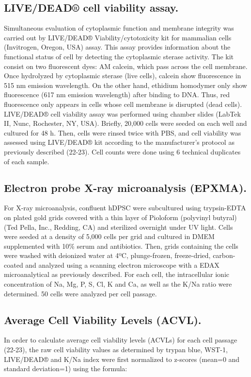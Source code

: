 \documentclass[a4paper,twocolumn,12pt]{article}
\begin{document}
\subsection{LIVE/DEAD® cell viability assay.}
Simultaneous evaluation of cytoplasmic function and membrane integrity was carried out by LIVE/DEAD® Viability/cytotoxicity kit for mammalian cells (Invitrogen, Oregon, USA) assay. This assay provides information about the functional status of cell by detecting the cytoplasmic sterase activity. The kit consist on two fluorescent dyes: AM calcein, which pass across the cell membrane. Once hydrolyzed by cytoplasmic sterase (live cells), calcein show fluorescence in 515 nm emission wavelength. On the other hand, ethidium homodymer only show fluorescence (617 nm emission wavelength) after binding to DNA. Thus, red fluorescence only appears in cells whose cell membrane is disrupted (dead cells). LIVE/DEAD® cell viability assay was performed using chamber slides (LabTek II, Nunc, Rochester, NY, USA). Briefly, 20,000 cells were seeded on each well and cultured for 48 h. Then, cells were rinsed twice with PBS, and cell viability was assessed using LIVE/DEAD® kit according to the manufacturer’s protocol as previously described (22-23). Cell counts were done using 6 technical duplicates of each sample.\\
\subsection{Electron probe X-ray microanalysis (EPXMA).}
For X-ray microanalysis, confluent hDPSC were subcultured using trypsin-EDTA on plated gold grids covered with a thin layer of Pioloform (polyvinyl butyral) (Ted Pella, Inc., Redding, CA) and sterilized overnight under UV light. Cells were seeded at a density of 5,000 cells per grid and cultured in DMEM supplemented with 10\% serum and antibiotics. Then, grids containing the cells were washed with deionized water at 4ºC, plunge-frozen, freeze-dried, carbon-coated and analyzed using a scanning electron microscope with a EDAX microanalytical as previously described. For each cell, the intracellular ionic concentration of Na, Mg, P, S, Cl, K and Ca, as well as the K/Na ratio were determined. 50 cells were analyzed per cell passage.
\subsection{Average Cell Viability Levels (ACVL).}
In order to calculate average cell viability levels (ACVLs) for each cell passage (22-23), the raw cell viability values as determined by trypan blue, WST-1, LIVE/DEAD® and K/Na index were first normalized to z-scores (mean=0 and standard deviation=1) using the formula: 
\end{document}

